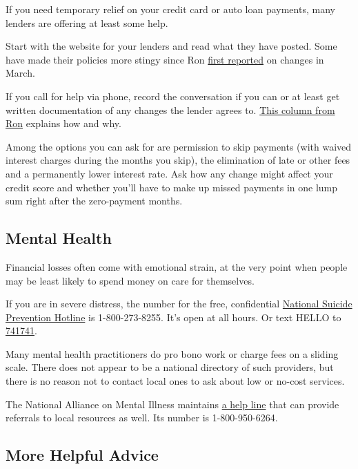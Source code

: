 If you need temporary relief on your credit card or auto loan payments,
many lenders are offering at least some help.

Start with the website for your lenders and read what they have posted.
Some have made their policies more stingy since Ron
\href{https://www.nytimes3xbfgragh.onion/2020/03/17/your-money/loan-waivers-coronavirus.html}{first
reported} on changes in March.

If you call for help via phone, record the conversation if you can or at
least get written documentation of any changes the lender agrees to.
\href{https://www.nytimes3xbfgragh.onion/2020/05/16/business/coronavirus-financial-help.html}{This
column from Ron} explains how and why.

Among the options you can ask for are permission to skip payments (with
waived interest charges during the months you skip), the elimination of
late or other fees and a permanently lower interest rate. Ask how any
change might affect your credit score and whether you'll have to make up
missed payments in one lump sum right after the zero-payment months.

\hypertarget{mental-health}{%
\subsection{Mental Health}\label{mental-health}}

Financial losses often come with emotional strain, at the very point
when people may be least likely to spend money on care for themselves.

If you are in severe distress, the number for the free, confidential
\href{https://suicidepreventionlifeline.org/our-crisis-centers/}{National
Suicide Prevention Hotline} is 1-800-273-8255. It's open at all hours.
Or text HELLO to \href{https://www.crisistextline.org/text-us/}{741741}.

Many mental health practitioners do pro bono work or charge fees on a
sliding scale. There does not appear to be a national directory of such
providers, but there is no reason not to contact local ones to ask about
low or no-cost services.

The National Alliance on Mental Illness maintains
\href{https://nami.org/Support-Education/NAMI-HelpLine/NAMI-HelpLine-FAQs}{a
help line} that can provide referrals to local resources as well. Its
number is 1-800-950-6264.

\hypertarget{more-helpful-advice}{%
\subsection{More Helpful Advice}\label{more-helpful-advice}}

